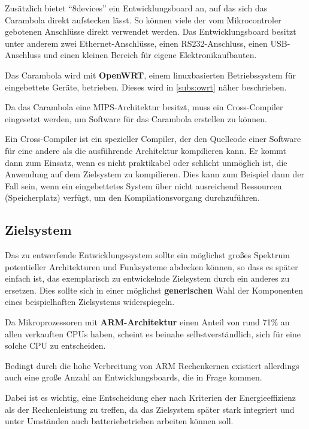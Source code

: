 Zusätzlich bietet "`8devices"' ein Entwicklungsboard an, auf das sich das
Carambola direkt aufstecken lässt. So können viele der vom Mikrocontroler
gebotenen Anschlüsse direkt verwendet werden. Das Entwicklungsboard besitzt
unter anderem zwei Ethernet-Anschlüsse, einen RS232-Anschluss, einen
USB-Anschluss und einen kleinen Bereich für eigene Elektronik\-aufbauten.

Das Carambola wird mit \textbf{OpenWRT}, einem linuxbasierten
Betriebssystem für eingebettete Geräte, betrieben. Dieses wird in
\autoref{subs:owrt} näher beschrieben.

Da das Carambola eine MIPS-Architektur besitzt, muss ein Cross-Compiler
eingesetzt werden, um Software für das Carambola erstellen zu können.
\begin{definition}
Ein Cross-Compiler ist ein spezieller Compiler, der den Quellcode einer
Software für eine andere als die ausführende Architektur kompilieren kann. Er
kommt dann zum Einsatz, wenn es nicht praktikabel oder schlicht unmöglich ist,
die Anwendung auf dem Zielsystem zu kompilieren. Dies kann zum Beispiel dann der
Fall sein, wenn ein eingebettetes System über nicht ausreichend Ressourcen
(Speicherplatz) verfügt, um den Kompilationsvorgang durchzuführen.
\end{definition}

\subsection{Zielsystem}
Das zu entwerfende Entwicklungssystem sollte ein möglichst
großes Spektrum potentieller Architekturen und Funksysteme abdecken können, so
dass es später einfach ist, das exemplarisch zu entwickelnde Zielsystem durch
ein anderes zu ersetzen. Dies sollte sich in einer möglichst
\textbf{generischen} Wahl der Komponenten eines beispielhaften Zielsystems
widerspiegeln.

Da Mikroprozessoren mit \textbf{ARM-Architektur} einen Anteil von rund
71\%\cite{IDC01} an allen verkauften CPUs haben, scheint es beinahe
selbstverständlich, sich für eine solche CPU zu entscheiden.

Bedingt durch die hohe Verbreitung von ARM Rechenkernen existiert allerdings
auch eine große Anzahl an Entwicklungsboards, die in Frage kommen.

Dabei ist es wichtig, eine Entscheidung eher nach Kriterien der Energieeffizienz
als der Rechenleistung zu treffen, da das Zielsystem später stark integriert
und unter Umständen auch batteriebetrieben arbeiten können soll.

